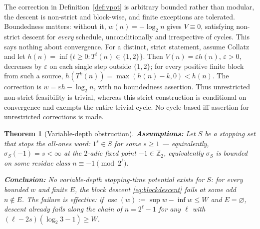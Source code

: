 \documentclass[11pt]{amsart}
\newtheorem{theorem}{Theorem}[section]
\theoremstyle{definition}
\theoremstyle{remark}
\newcommand{\Z}{\mathbb{Z}}
\newcommand{\Ztwo}{\Z_2}
\begin{document}
The correction in Definition~\ref{def:vpot} is arbitrary bounded rather than modular, the descent is non-strict and block-wise, and finite exceptions are tolerated. Boundedness matters: without it, $w(n)=-\log_2 n$ gives $V\equiv0$, satisfying non-strict descent for \emph{every} schedule, unconditionally and irrespective of cycles. This says nothing about convergence. For a distinct, strict statement, assume Collatz and let $h(n)=\inf\{t\ge0:T^t(n)\in\{1,2\}\}$. Then $V(n)=\varepsilon h(n)$, $\varepsilon>0$, decreases by $\varepsilon$ on each single step outside $\{1,2\}$; for every positive finite block from such a source, $h(T^k(n))=\max(h(n)-k,0)<h(n)$. The correction is $w=\varepsilon h-\log_2 n$, with no boundedness assertion. Thus unrestricted non-strict feasibility is trivial, whereas this strict construction is conditional on convergence and exempts the entire trivial cycle. No cycle-based iff assertion for unrestricted corrections is made.

\begin{theorem}[Variable-depth obstruction]\label{thm:stopping}
\textbf{Assumptions:} Let $S$ be a stopping set that stops the all-ones word: $1^s \in S$ for some $s \ge 1$ --- equivalently, $\sigma_S(-1) = s < \infty$ at the $2$-adic fixed point $-1 \in \Ztwo$, equivalently $\sigma_S$ is bounded on some residue class $n \equiv -1 \pmod{2^\ell}$.

\textbf{Conclusion:} No variable-depth stopping-time potential exists for $S$: for every bounded $w$ and finite $E$, the block descent \eqref{eq:blockdescent} fails at some odd $n \notin E$. The failure is effective: if $\operatorname{osc}(w) := \sup w - \inf w \le W$ and $E = \varnothing$, descent already fails along the chain of $n = 2^\ell - 1$ for any $\ell$ with $(\ell - 2s)(\log_2 3 - 1) \ge W$.
\end{theorem}
\end{document}
